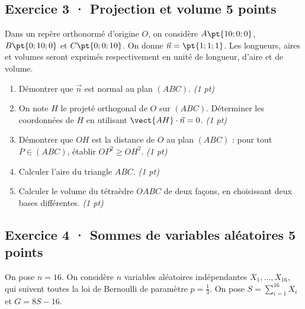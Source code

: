 \mxnewpage{}

\subsection*{Exercice 3 · Projection et volume \hfill 5 points}Dans un repère orthonormé d'origine $O$, on considère $A\pt{10;0;0}$, $B\pt{0;10;0}$ et $C\pt{0;0;10}$. On donne $\vec n=\pt{1;1;1}$. Les longueurs, aires et volumes seront exprimés respectivement en unité de longueur, d'aire et de volume.

\begin{enumerate}

\item Démontrer que $\vec n$ est normal au plan $(ABC)$. \hfill\textit{(1 pt)}

\item On note $H$ le projeté orthogonal de $O$ sur $(ABC)$. Déterminer les coordonnées de $H$ en utilisant $\vect{AH}\cdot\vec n=0$. \hfill\textit{(1 pt)}

\item Démontrer que $OH$ est la distance de $O$ au plan $(ABC)$ : pour tout $P\in(ABC)$, établir $OP^2\ge OH^2$. \hfill\textit{(1 pt)}

\item Calculer l'aire du triangle $ABC$. \hfill\textit{(1 pt)}

\item Calculer le volume du tétraèdre $OABC$ de deux façons, en choisissant deux bases différentes. \hfill\textit{(1 pt)}

\end{enumerate}

\subsection*{Exercice 4 · Sommes de variables aléatoires \hfill 5 points}On pose $n=16$. On considère $n$ variables aléatoires indépendantes $X_1,\ldots,X_{16}$, qui suivent toutes la loi de Bernoulli de paramètre $p=\frac{1}{3}$. On pose $S=\displaystyle\sum_{i=1}^{16}X_i$ et $G=8S-16$.

